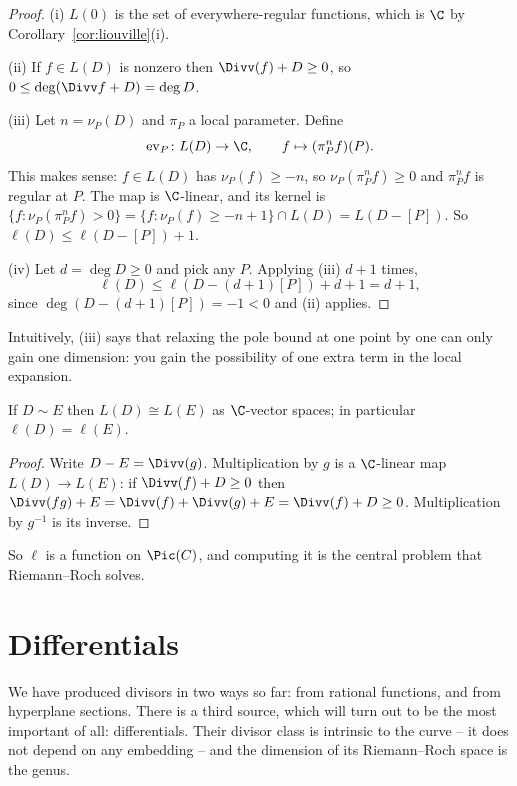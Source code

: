 \begin{proof}
	(i) $L(0)$ is the set of everywhere-regular functions, which is $\C$ by Corollary~\ref{cor:liouville}(i).

	(ii) If $f \in L(D)$ is nonzero then $\Divv(f) + D \geq 0$, so $0 \leq \deg(\Divv f + D) = \deg D$.

	(iii) Let $n = \nu_P(D)$ and $\pi_P$ a local parameter. Define
	$$\mathrm{ev}_P \colon L(D) \to \C, \qquad f \mapsto (\pi_P^{n}f)(P).$$
	This makes sense: $f \in L(D)$ has $\nu_P(f)\geq -n$, so $\nu_P(\pi_P^nf)\geq 0$ and $\pi_P^nf$ is regular at $P$. The map is $\C$-linear, and its kernel is $\{f : \nu_P(\pi_P^nf) > 0\} = \{f : \nu_P(f) \geq -n+1\} \cap L(D) = L(D - [P])$. So $\ell(D) \leq \ell(D-[P]) + 1$.

	(iv) Let $d = \deg D \geq 0$ and pick any $P$. Applying (iii) $d+1$ times,
	$$\ell(D) \leq \ell(D - (d+1)[P]) + d + 1 = d+1,$$
	since $\deg(D - (d+1)[P]) = -1 < 0$ and (ii) applies.
\end{proof}

Intuitively, (iii) says that relaxing the pole bound at one point by one can only gain one dimension: you gain the possibility of one extra term in the local expansion.

\begin{proposition}\label{prop:Lsim}
	If $D \sim E$ then $L(D)\cong L(E)$ as $\C$-vector spaces; in particular $\ell(D) = \ell(E)$.
\end{proposition}

\begin{proof}
	Write $D - E = \Divv(g)$. Multiplication by $g$ is a $\C$-linear map $L(D)\to L(E)$: if $\Divv(f)+D\geq0$ then $\Divv(fg) + E = \Divv(f) + \Divv(g) + E = \Divv(f)+D \geq 0$. Multiplication by $g^{-1}$ is its inverse.
\end{proof}

So $\ell$ is a function on $\Pic(C)$, and computing it is the central problem that Riemann--Roch solves.

\section{Differentials}\label{ag-sec:differentials}

We have produced divisors in two ways so far: from rational functions, and from hyperplane sections. There is a third source, which will turn out to be the most important of all: differentials. Their divisor class is intrinsic to the curve -- it does not depend on any embedding -- and the dimension of its Riemann--Roch space is the genus.

